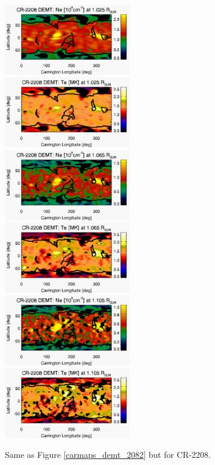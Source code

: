 \documentclass[namedreferences]{solarphysics}
\begin{document}
\begin{article}
\begin{figure}[h!]
\begin{center}
\includegraphics[width=0.495\textwidth]{figs/map_Ne_CR2208_DEMT-AIA_H1_L522_r3d_multistart2_1025_Rsun.pdf}
\includegraphics[width=0.495\textwidth]{figs/map_Tm_CR2208_DEMT-AIA_H1_L522_r3d_multistart2_1025_Rsun.pdf}
\includegraphics[width=0.495\textwidth]{figs/map_Ne_CR2208_DEMT-AIA_H1_L522_r3d_multistart2_1065_Rsun.pdf}
\includegraphics[width=0.495\textwidth]{figs/map_Tm_CR2208_DEMT-AIA_H1_L522_r3d_multistart2_1065_Rsun.pdf}
\includegraphics[width=0.495\textwidth]{figs/map_Ne_CR2208_DEMT-AIA_H1_L522_r3d_multistart2_1105_Rsun.pdf}
\includegraphics[width=0.495\textwidth]{figs/map_Tm_CR2208_DEMT-AIA_H1_L522_r3d_multistart2_1105_Rsun.pdf}
\caption{Same as Figure \ref{carmaps_demt_2082} but for CR-2208.}
\label{carmaps_demt_2208}
\end{center}
\end{figure}


\end{article}
\end{document}

